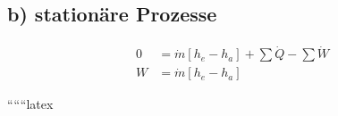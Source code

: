 \subsection*{b) stationäre Prozesse}

\begin{align*}
0 &= \dot{m} \left[ h_e - h_a \right] + \sum \dot{Q} - \sum \dot{W} \\
W &= \dot{m} \left[ h_e - h_a \right]
\end{align*}

``````latex